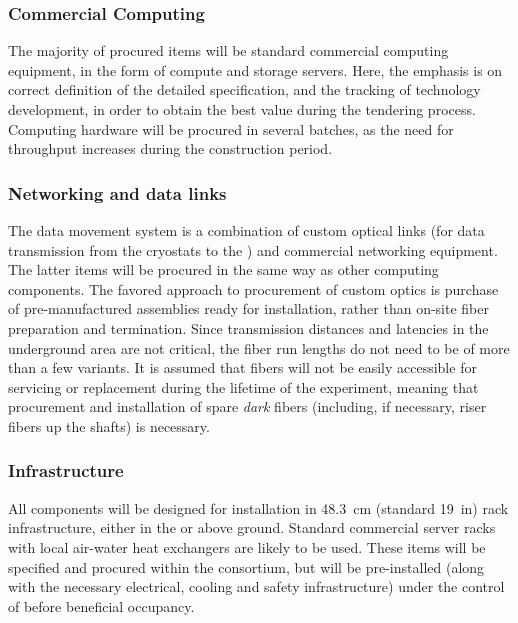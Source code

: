 \subsubsection{Commercial Computing}

The majority of procured items will be standard commercial computing equipment, in the form of compute and storage servers. Here, the emphasis is on correct definition of the detailed specification, and the tracking of technology development, in order to obtain the best value %
during the tendering process. Computing hardware will be procured in several batches, as the need for  throughput increases during the construction period. 

\subsubsection{Networking and data links}

The data movement system is a combination of custom optical links (for data transmission from the cryostats to the ) and commercial networking equipment. The latter items will be procured in the same way as other computing components. The favored approach to procurement of custom optics is purchase of pre-manufactured assemblies ready for installation, rather than %
on-site fiber preparation and termination. Since transmission distances and latencies in the underground area are not critical, the fiber run lengths do not need to be of more than a few variants. It is assumed that fibers will not be easily accessible for servicing or replacement during the lifetime of the experiment, meaning that procurement and installation of spare \textit{dark} fibers (including, if necessary, riser fibers up the shafts) is necessary.

\subsubsection{Infrastructure}

All  components will be designed for installation in \SI{48.3}{cm} (standard \SI{19}{in}) rack infrastructure, either in the  or above ground. Standard commercial server racks with local air-water heat exchangers are likely to be used. These items will be specified and procured within the consortium, but will be pre-installed (along with the necessary electrical, cooling and safety infrastructure) under the control of  before  beneficial occupancy.

